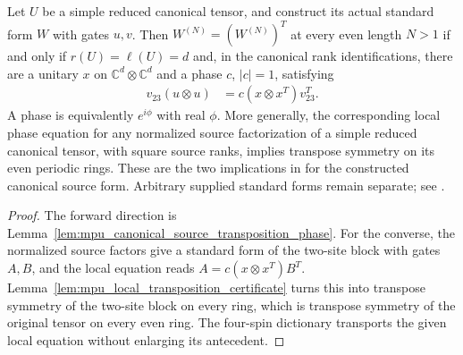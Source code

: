 \begin{lemma}
    \label{lem:mpu_canonical_even_transposition_iff}
    \leanok
    Let $U$ be a simple reduced canonical tensor, and construct its actual
    standard form $W$ with gates $u,v$. Then $W^{(N)}=(W^{(N)})^T$ at every
    even length $N>1$ if and only if $r(U)=\ell(U)=d$ and, in the canonical
    rank identifications, there are a unitary $x$ on
    $\mathbb C^d\otimes\mathbb C^d$ and a phase $c$, $|c|=1$, satisfying
    \begin{align}
        v_{23}(u\otimes u) & =c(x\otimes x^T)v_{23}^T.
    \end{align}
    A phase is equivalently $e^{i\phi}$ with real $\phi$. More generally,
    the corresponding local phase equation for any normalized source
    factorization of a simple reduced canonical tensor, with square source
    ranks, implies transpose symmetry on its even periodic rings.
    These are the two implications in \cite[lines~1266--1288]{Cirac2017MPU}
    for the constructed canonical source form. Arbitrary supplied standard
    forms remain separate; see
    \cite{gap:mpu_canonical_form_full_support}.
\end{lemma}

\begin{proof}\leanok
    The forward direction is
    Lemma~\ref{lem:mpu_canonical_source_transposition_phase}. For the
    converse, the normalized source factors give a standard form of the
    two-site block with gates $A,B$, and the local equation reads
    $A=c(x\otimes x^T)B^T$. Lemma~\ref{lem:mpu_local_transposition_certificate}
    turns this into transpose symmetry of the two-site block on every ring,
    which is transpose symmetry of the original tensor on every even ring.
    The four-spin dictionary transports the given local equation without
    enlarging its antecedent.
\end{proof}

